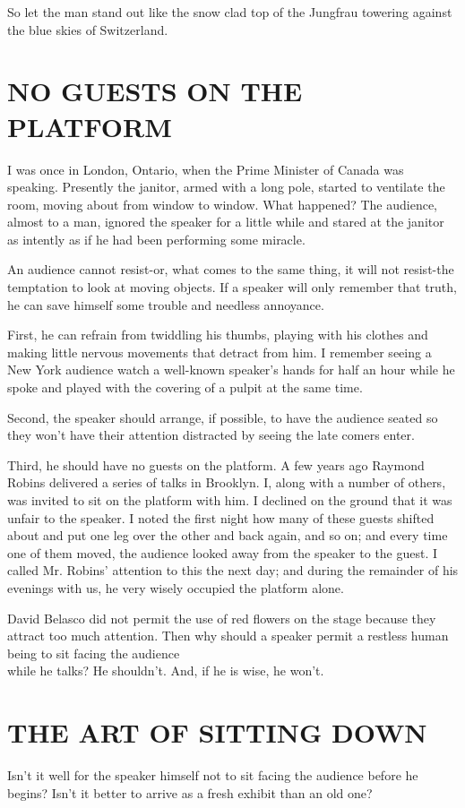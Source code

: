 \documentclass[10pt]{article}
\begin{document}
So let the man stand out like the snow clad top of the Jungfrau towering against the blue skies of Switzerland.

\section*{NO GUESTS ON THE PLATFORM}
I was once in London, Ontario, when the Prime Minister of Canada was speaking. Presently the janitor, armed with a long pole, started to ventilate the room, moving about from window to window. What happened? The audience, almost to a man, ignored the speaker for a little while and stared at the janitor as intently as if he had been performing some miracle.

An audience cannot resist-or, what comes to the same thing, it will not resist-the temptation to look at moving objects. If a speaker will only remember that truth, he can save himself some trouble and needless annoyance.

First, he can refrain from twiddling his thumbs, playing with his clothes and making little nervous movements that detract from him. I remember seeing a New York audience watch a well-known speaker's hands for half an hour while he spoke and played with the covering of a pulpit at the same time.

Second, the speaker should arrange, if possible, to have the audience seated so they won't have their attention distracted by seeing the late comers enter.

Third, he should have no guests on the platform. A few years ago Raymond Robins delivered a series of talks in Brooklyn. I, along with a number of others, was invited to sit on the platform with him. I declined on the ground that it was unfair to the speaker. I noted the first night how many of these guests shifted about and put one leg over the other and back again, and so on; and every time one of them moved, the audience looked away from the speaker to the guest. I called Mr. Robins' attention to this the next day; and during the remainder of his evenings with us, he very wisely occupied the platform alone.

David Belasco did not permit the use of red flowers on the stage because they attract too much attention. Then why should a speaker permit a restless human being to sit facing the audience\\
while he talks? He shouldn't. And, if he is wise, he won't.

\section*{THE ART OF SITTING DOWN}
Isn't it well for the speaker himself not to sit facing the audience before he begins? Isn't it better to arrive as a fresh exhibit than an old one?
\end{document}
